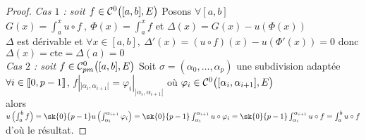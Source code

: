     ${}$ \\ 
    \begin{proof}
    \emph{Cas $1$ : soit $f\in{\mathcal{C}}^0 \big( [a,b] ,E \big)$} Posons $\forall[a,b]$\\ $G(x) = \int_a^x u\circ f ~,~ \Phi (x) = \int_a^x f$ 
    et $\Delta (x) = G(x) - u(\Phi (x)) $ \\ $\Delta$ est dérivable et $\forall x\in [a,b] , ~\Delta'(x) = (u\circ f)(x) - u(\Phi'(x)) = 0$ 
    donc $\Delta (x) = \mathrm{cte} = \Delta (a) =0$ \\ \emph{Cas $2$ : soit $f\in{\mathcal{C}_{pm}^0} \big( [a,b] ,E \big)$} Soit $\sigma = (\alpha_0 , 
    \dots ,\alpha_p)$ une subdivision adaptée \\$\forall i\in {\llbracket 0,p-1 \rrbracket}$, $f|_{]\alpha_i , \alpha_{i+1}[} = 
    \varphi_i|_{]\alpha_i , \alpha_{i+1}[}$ où $\varphi_i \in {\mathcal{C}}^0 \big( [\alpha_i , \alpha_{i+1} ],E\big) $\\ alors 
    $u\left( \int_a^b f\right) = \sk{0}{p-1} u\left( \int_{\alpha_i}^{\alpha_{i+1}} \varphi_i \right) = \sk{0}{p-1} 
    \int_{\alpha_i}^{\alpha_{i+1}} u\circ \varphi_i = \sk{0}{p-1} \int_{\alpha_i}^{\alpha_{i+1}} u\circ f =\int_a^b u\circ f$ d'où le résultat.
    \end{proof}
